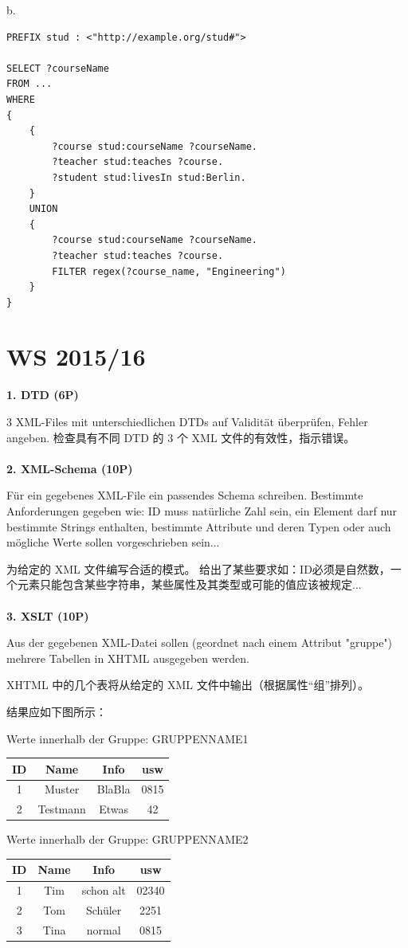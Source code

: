 \documentclass[fontset=windows]{article}
\begin{document}
b.
\begin{verbatim}
PREFIX stud : <"http://example.org/stud#">

SELECT ?courseName
FROM ...
WHERE
{
	{
		?course stud:courseName ?courseName.
		?teacher stud:teaches ?course.
		?student stud:livesIn stud:Berlin.
	}
	UNION
	{
		?course stud:courseName ?courseName.
		?teacher stud:teaches ?course.
		FILTER regex(?course_name, "Engineering")
	}
}
\end{verbatim}

\section{WS 2015/16}

\noindent\textbf{1. DTD (6P)}

3 XML-Files mit unterschiedlichen DTDs auf Validität überprüfen, Fehler angeben.
检查具有不同 DTD 的 3 个 XML 文件的有效性，指示错误。
\\
\\
\textbf{2. XML-Schema (10P)}

Für ein gegebenes XML-File ein passendes Schema schreiben. Bestimmte Anforderungen gegeben wie: ID muss natürliche Zahl sein, ein Element darf nur bestimmte Strings enthalten, bestimmte Attribute und deren Typen oder auch mögliche Werte sollen vorgeschrieben sein...

为给定的 XML 文件编写合适的模式。 给出了某些要求如：ID必须是自然数，一个元素只能包含某些字符串，某些属性及其类型或可能的值应该被规定...
\\
\\
\textbf{3. XSLT (10P)}

Aus der gegebenen XML-Datei sollen (geordnet nach einem Attribut "gruppe") mehrere Tabellen in XHTML ausgegeben werden.

XHTML 中的几个表将从给定的 XML 文件中输出（根据属性“组”排列）。

结果应如下图所示：

Werte innerhalb der Gruppe: GRUPPENNAME1
\begin{tabular}{|c|c|c|c|}
	\hline
	ID&Name&Info&usw\\
	\hline
	1&Muster&BlaBla&0815\\
	\hline
	2&Testmann&Etwas&42\\
	\hline
\end{tabular}

Werte innerhalb der Gruppe: GRUPPENNAME2
\begin{tabular}{|c|c|c|c|}
	\hline
	ID&Name&Info&usw\\
	\hline
	1&Tim&schon alt&02340\\
	\hline
	2&Tom&Schüler&2251\\
	\hline
	3&Tina&normal&0815\\
	\hline
\end{tabular}
\end{document}
